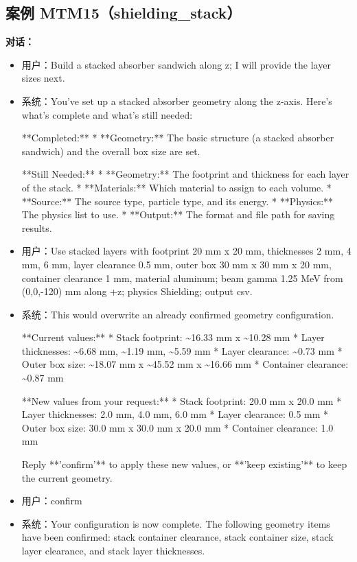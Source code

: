 \documentclass[11pt]{ctexart}
\begin{document}
\subsection{案例 MTM15（shielding\_stack）}
\textbf{对话：}
\begin{itemize}
\item 用户：Build a stacked absorber sandwich along z; I will provide the layer sizes next.
\item 系统：You've set up a stacked absorber geometry along the z-axis. Here's what's complete and what's still needed:

**Completed:**
*   **Geometry:** The basic structure (a stacked absorber sandwich) and the overall box size are set.

**Still Needed:**
*   **Geometry:** The footprint and thickness for each layer of the stack.
*   **Materials:** Which material to assign to each volume.
*   **Source:** The source type, particle type, and its energy.
*   **Physics:** The physics list to use.
*   **Output:** The format and file path for saving results.
\item 用户：Use stacked layers with footprint 20 mm x 20 mm, thicknesses 2 mm, 4 mm, 6 mm, layer clearance 0.5 mm, outer box 30 mm x 30 mm x 20 mm, container clearance 1 mm, material aluminum; beam gamma 1.25 MeV from (0,0,-120) mm along +z; physics Shielding; output csv.
\item 系统：This would overwrite an already confirmed geometry configuration.

**Current values:**
*   Stack footprint: \textasciitilde{}16.33 mm x \textasciitilde{}10.28 mm
*   Layer thicknesses: \textasciitilde{}6.68 mm, \textasciitilde{}1.19 mm, \textasciitilde{}5.59 mm
*   Layer clearance: \textasciitilde{}0.73 mm
*   Outer box size: \textasciitilde{}18.07 mm x \textasciitilde{}45.52 mm x \textasciitilde{}16.66 mm
*   Container clearance: \textasciitilde{}0.87 mm

**New values from your request:**
*   Stack footprint: 20.0 mm x 20.0 mm
*   Layer thicknesses: 2.0 mm, 4.0 mm, 6.0 mm
*   Layer clearance: 0.5 mm
*   Outer box size: 30.0 mm x 30.0 mm x 20.0 mm
*   Container clearance: 1.0 mm

Reply **'confirm'** to apply these new values, or **'keep existing'** to keep the current geometry.
\item 用户：confirm
\item 系统：Your configuration is now complete. The following geometry items have been confirmed: stack container clearance, stack container size, stack layer clearance, and stack layer thicknesses.
\end{itemize}
\end{document}
